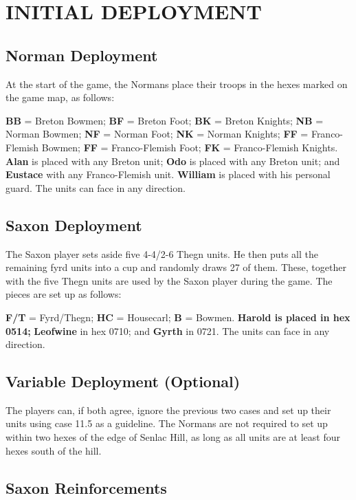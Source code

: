 \section{INITIAL DEPLOYMENT}

\subsection{Norman Deployment}

At the start of the game, the Normans place their troops in the hexes marked on the game map, as follows:

\textbf{BB} = Breton Bowmen; \textbf{BF} = Breton Foot; \textbf{BK} = Breton Knights; \textbf{NB} = Norman Bowmen; \textbf{NF} = Norman Foot; \textbf{NK} = Norman Knights; \textbf{FF} = Franco-Flemish Bowmen; \textbf{FF} = Franco-Flemish Foot; \textbf{FK} = Franco-Flemish Knights. \textbf{Alan} is placed with any Breton unit; \textbf{Odo} is placed with any Breton unit; and \textbf{Eustace} with any Franco-Flemish unit. \textbf{William} is placed with his personal guard. The units can face in any direction.

\subsection{Saxon Deployment}

The Saxon player sets aside five 4-4/2-6 Thegn units. He then puts all the remaining fyrd units into a cup and randomly draws 27 of them. These, together with the five Thegn units are used by the Saxon player during the game. The pieces are set up as follows:

\textbf{F/T} = Fyrd/Thegn; \textbf{HC} = Housecarl; \textbf{B} = Bowmen. \textbf{Harold is placed in hex 0514;} \textbf{Leofwine} in hex 0710; and \textbf{Gyrth} in 0721. The units can face in any direction.

\subsection{Variable Deployment (Optional)}

The players can, if both agree, ignore the previous two cases and set up their units using case 11.5 as a guideline. The Normans are not required to set up within two hexes of the edge of Senlac Hill, as long as all units are at least four hexes south of the hill.

\subsection{Saxon Reinforcements}

